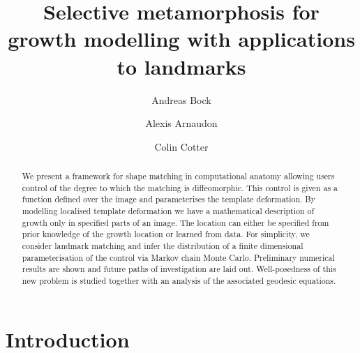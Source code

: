 \documentclass[runningheads]{llncs}
\begin{document}
%
\title{Selective metamorphosis for growth modelling with applications to landmarks}
%
%
\author{Andreas Bock \and  Alexis Arnaudon \and Colin Cotter}
%
%
%
\maketitle              %

\begin{abstract}
We present a framework for shape matching in computational anatomy allowing
users control of the degree to which the matching is diffeomorphic. This control
is given as a function defined over the image and parameterises the template
deformation. By modelling localised template deformation we have a mathematical
description of growth only in specified parts of an image. The location can
either be specified from prior knowledge of the growth location or learned from
data. For simplicity, we consider landmark matching and infer the distribution of
a finite dimensional parameterisation of the control via Markov chain Monte
Carlo.  Preliminary numerical results are shown and future paths of
investigation are laid out. Well-posedness of this new problem is studied
together with an analysis of the associated geodesic equations. 
\end{abstract}

\section{Introduction}
\end{document}
